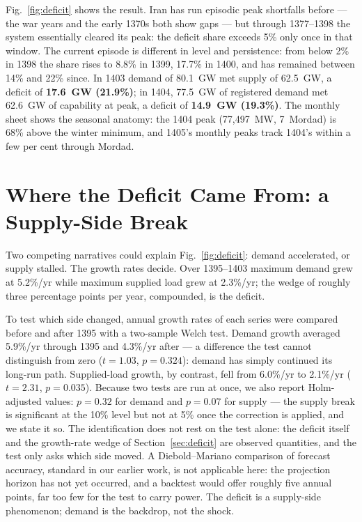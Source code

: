 \documentclass[conference]{IEEEtran}
\begin{document}
Fig.~\ref{fig:deficit} shows the result. Iran has run episodic peak shortfalls before --- the war years and the early 1370s both show gaps --- but through 1377--1398 the system essentially cleared its peak: the deficit share exceeds 5\% only once in that window. The current episode is different in level and persistence: from below 2\% in 1398 the share rises to 8.8\% in 1399, 17.7\% in 1400, and has remained between 14\% and 22\% since. In 1403 demand of 80.1~GW met supply of 62.5~GW, a deficit of \textbf{17.6~GW (21.9\%)}; in 1404, 77.5~GW of registered demand met 62.6~GW of capability at peak, a deficit of \textbf{14.9~GW (19.3\%)}. The monthly sheet shows the seasonal anatomy: the 1404 peak (77{,}497~MW, 7~Mordad) is 68\% above the winter minimum, and 1405's monthly peaks track 1404's within a few per cent through Mordad.

\section{Where the Deficit Came From: a Supply-Side Break}
\label{sec:break}
Two competing narratives could explain Fig.~\ref{fig:deficit}: demand accelerated, or supply stalled. The growth rates decide. Over 1395--1403 maximum demand grew at 5.2\%/yr while maximum supplied load grew at 2.3\%/yr; the wedge of roughly three percentage points per year, compounded, is the deficit.

To test which side changed, annual growth rates of each series were compared before and after 1395 with a two-sample Welch test. Demand growth averaged 5.9\%/yr through 1395 and 4.3\%/yr after --- a difference the test cannot distinguish from zero ($t=1.03$, $p=0.324$): demand has simply continued its long-run path. Supplied-load growth, by contrast, fell from 6.0\%/yr to 2.1\%/yr ($t=2.31$, $p=0.035$). Because two tests are run at once, we also report Holm-adjusted values: $p=0.32$ for demand and $p=0.07$ for supply --- the supply break is significant at the 10\% level but not at 5\% once the correction is applied, and we state it so. The identification does not rest on the test alone: the deficit itself and the growth-rate wedge of Section~\ref{sec:deficit} are observed quantities, and the test only asks which side moved. A Diebold--Mariano comparison of forecast accuracy, standard in our earlier work, is not applicable here: the projection horizon has not yet occurred, and a backtest would offer roughly five annual points, far too few for the test to carry power. The deficit is a supply-side phenomenon; demand is the backdrop, not the shock.
\end{document}
